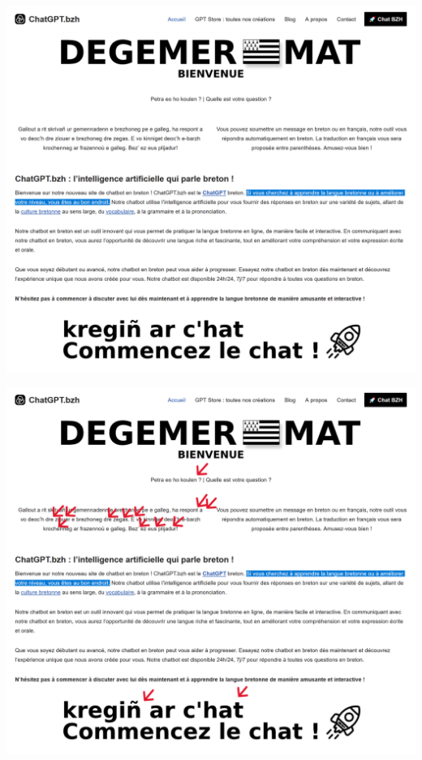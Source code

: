 \documentclass[
	xcolor={svgnames},
	aspectratio=169,
	french,
]{beamer}
\begin{document}
\begin{frame}[plain]
	\begin{overprint}
		\onslide<+>
			\centerline{
				\includegraphics[width=1\textwidth,height=\textheight, keepaspectratio]{pics/couturier 24.03.2024 - frontpage.PNG}
			}
		\onslide<+>
			\centerline{
				\includegraphics[width=1\textwidth,height=\textheight, keepaspectratio]{pics/couturier 24.03.2024 - frontpage - fautes marquees.PNG}
			}				
	\end{overprint}
\end{frame}
\end{document}
